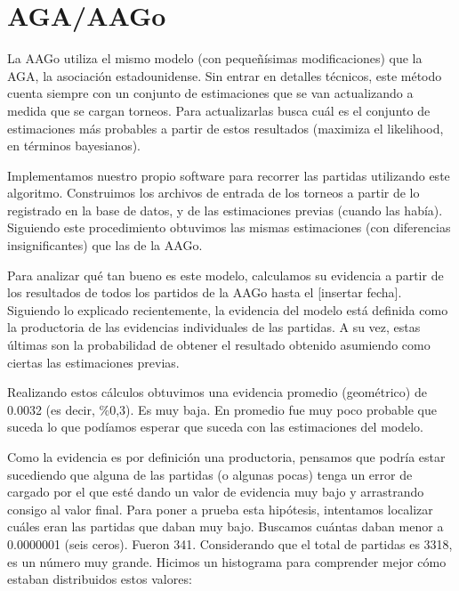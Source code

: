 \documentclass[a4paper,10pt]{report}
\begin{document}
\section*{AGA/AAGo}

La AAGo utiliza el mismo modelo (con pequeñísimas modificaciones) que la AGA, la asociación estadounidense.
Sin entrar en detalles técnicos, este método cuenta siempre con un conjunto de estimaciones que se van actualizando a medida que se cargan torneos.
Para actualizarlas busca cuál es el conjunto de estimaciones más probables a partir de estos resultados (maximiza el likelihood, en términos bayesianos).


Implementamos nuestro propio software para recorrer las partidas utilizando este algoritmo.
Construimos los archivos de entrada de los torneos a partir de lo registrado en la base de datos, y de las estimaciones previas (cuando las había).
Siguiendo este procedimiento obtuvimos las mismas estimaciones (con diferencias insignificantes) que las de la AAGo.

Para analizar qué tan bueno es este modelo, calculamos su evidencia a partir de los resultados de todos los partidos de la AAGo hasta el [insertar fecha].
Siguiendo lo explicado recientemente, la evidencia del modelo está definida como la productoria de las evidencias individuales de las partidas.
A su vez, estas últimas son la probabilidad de obtener el resultado obtenido asumiendo como ciertas las estimaciones previas. %

Realizando estos cálculos obtuvimos una evidencia promedio (geométrico) de 0.0032 (es decir, \%0,3).
Es muy baja.
En promedio fue muy poco probable que suceda lo que podíamos esperar que suceda con las estimaciones del modelo.


Como la evidencia es por definición una productoria, pensamos que podría estar sucediendo que alguna de las partidas (o algunas pocas) tenga un error de cargado por el que esté dando un valor de evidencia muy bajo y arrastrando consigo al valor final.
Para poner a prueba esta hipótesis, intentamos localizar cuáles eran las partidas que daban muy bajo.
Buscamos cuántas daban menor a 0.0000001 (seis ceros).
Fueron 341.
Considerando que el total de partidas es 3318, es un número muy grande.
Hicimos un histograma para comprender mejor cómo estaban distribuidos estos valores:
\end{document}
